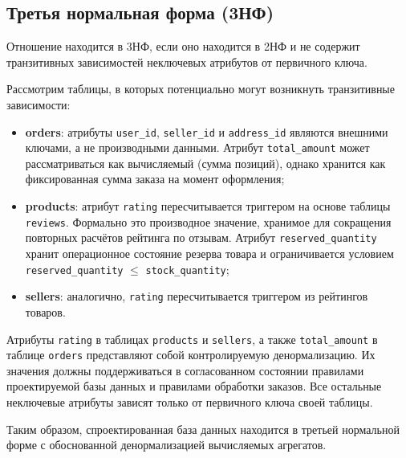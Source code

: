 \subsection*{Третья нормальная форма (3НФ)}

Отношение находится в 3НФ, если оно находится в 2НФ и не содержит транзитивных зависимостей неключевых атрибутов от первичного ключа.

Рассмотрим таблицы, в которых потенциально могут возникнуть транзитивные зависимости:

\begin{itemize}
    \item \textbf{orders}: атрибуты \texttt{user\_id}, \texttt{seller\_id} и \texttt{address\_id} являются внешними ключами, а не производными данными. Атрибут \texttt{total\_amount} может рассматриваться как вычисляемый (сумма позиций), однако хранится как фиксированная сумма заказа на момент оформления;
    \item \textbf{products}: атрибут \texttt{rating} пересчитывается триггером на основе таблицы \texttt{reviews}. Формально это производное значение, хранимое для сокращения повторных расчётов рейтинга по отзывам. Атрибут \texttt{reserved\_quantity} хранит операционное состояние резерва товара и ограничивается условием \texttt{reserved\_quantity} $\leq$ \texttt{stock\_quantity};
    \item \textbf{sellers}: аналогично, \texttt{rating} пересчитывается триггером из рейтингов товаров.
\end{itemize}

Атрибуты \texttt{rating} в таблицах \texttt{products} и \texttt{sellers}, а также \texttt{total\_amount} в таблице \texttt{orders} представляют собой контролируемую денормализацию. Их значения должны поддерживаться в согласованном состоянии правилами проектируемой базы данных и правилами обработки заказов. Все остальные неключевые атрибуты зависят только от первичного ключа своей таблицы.

Таким образом, спроектированная база данных находится в третьей нормальной форме с обоснованной денормализацией вычисляемых агрегатов.
